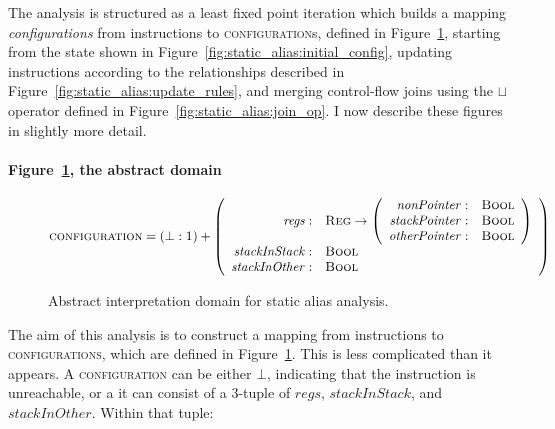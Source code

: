 The analysis is structured as a least fixed point iteration which
builds a mapping \textit{configurations} from instructions to
\textsc{configuration}s, defined in
Figure~\ref{fig:static_alias:abstract_domain}, starting from the state shown in
Figure~\ref{fig:static_alias:initial_config}, updating instructions
according to the relationships described in
Figure~\ref{fig:static_alias:update_rules}, and merging control-flow
joins using the $\sqcup$ operator defined in
Figure~\ref{fig:static_alias:join_op}.  I now describe these figures
in slightly more detail.

\paragraph{Figure~\ref{fig:static_alias:abstract_domain}, the abstract domain}

\begin{figure}
  \begin{displaymath}
    \textsc{configuration} = (\bot: \textsc{1}) + \left(\begin{array}{rl}%
      \mathit{regs}         :& \textsc{Reg} \rightarrow \left(\begin{array}{rl}%
        \mathit{nonPointer}   :& \textsc{Bool}\\
        \mathit{stackPointer} :& \textsc{Bool}\\
        \mathit{otherPointer} :& \textsc{Bool}
      \end{array}\right)\\
      \mathit{stackInStack} :& \textsc{Bool} \\
      \mathit{stackInOther} :& \textsc{Bool}
    \end{array}\right)
  \end{displaymath}
  \caption{Abstract interpretation domain for static alias analysis.}
  \label{fig:static_alias:abstract_domain}
\end{figure}

The aim of this analysis is to construct a mapping from instructions
to \textsc{configurations}, which are defined in
Figure~\ref{fig:static_alias:abstract_domain}.  This is less
complicated than it appears.  A \textsc{configuration} can be either
$\bot$, indicating that the instruction is unreachable, or a it can
consist of a 3-tuple of $\mathit{regs}$, $\mathit{stackInStack}$, and
$\mathit{stackInOther}$.  Within that tuple:

